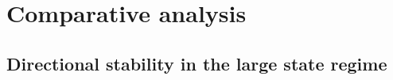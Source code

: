 \documentclass[11pt]{article}
\begin{document}


\section{Comparative analysis}\label{sec:comparative.analysis}

\subsection{Directional stability in the large state regime} \label{sec:inward_drift}
\end{document}
